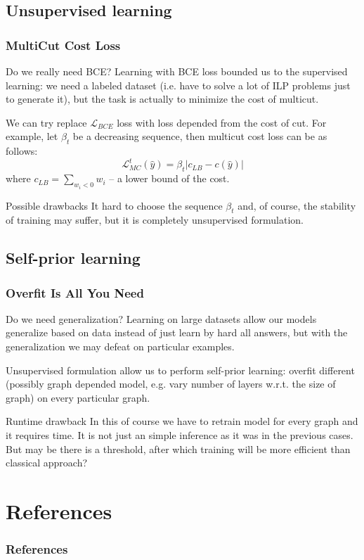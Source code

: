 \documentclass{beamer}
\begin{document}
\subsection{Unsupervised learning}

\begin{frame}
    \frametitle{MultiCut Cost Loss}

    \begin{block}{Do we really need BCE?}
        Learning with BCE loss bounded us to the supervised learning: we need
        a labeled dataset (i.e. have to solve a lot of ILP problems just to
        generate it), but the task is actually to minimize the cost of multicut.
    \end{block}

    We can try replace $\mathcal{L}_{BCE}$ loss with
    loss depended from the cost of cut. For example, let $\beta_t$ be
    a decreasing sequence, then multicut cost loss can be as follows:
    \[
        \mathcal{L}_{MC}^{t} (\hat{y}) = \beta_t |c_{LB} - c(\hat{y})|
    \]
    where $c_{LB} = \sum\limits_{w_i < 0} w_i$ -- a lower bound of the cost.

    \begin{alertblock}{Possible drawbacks}
        It hard to choose the sequence $\beta_t$ and, of course,
        the stability of training may suffer, but it is completely
        unsupervised formulation.
    \end{alertblock}

\end{frame}

\subsection{Self-prior learning}

\begin{frame}
    \frametitle{Overfit Is All You Need}

    \begin{block}{Do we need generalization?}
        Learning on large datasets allow our models generalize
        based on data instead of just learn by hard all answers,
        but with the generalization we may defeat on particular examples.
    \end{block}

    Unsupervised formulation allow us to perform self-prior
    learning: overfit different (possibly graph depended model, e.g. vary
    number of layers w.r.t. the size of graph) on
    every particular graph.

    \begin{alertblock}{Runtime drawback}
        In this of course we have to retrain model for every
        graph and it requires time. It is not just an simple inference
        as it was in the previous cases. But may be there is a threshold, after
        which training will be more efficient than classical approach?
    \end{alertblock}

\end{frame}

\section*{References}

\begin{frame}[allowframebreaks]
    \frametitle{References}

    
    
\end{frame}
\end{document}

